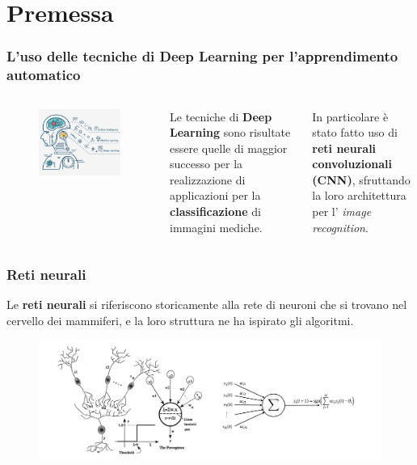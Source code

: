 \documentclass{beamer}
\begin{document}
	 \section{Premessa}
\begin{frame}
	\frametitle{L'uso delle tecniche di Deep Learning per l'apprendimento automatico
	}
	\begin{columns}
		\begin{figure}
			\includegraphics[width=\textwidth]{learning.png}
		\end{figure}
		Le tecniche di \textbf{Deep Learning} sono risultate essere quelle di maggior successo per la realizzazione di applicazioni per la \textbf{classificazione} di immagini mediche.
	
	In particolare è stato fatto uso di \textbf{reti neurali convoluzionali (CNN)}, sfruttando la loro architettura per l'
	\emph{image recognition}.
	\end{columns}
\end{frame}

\begin{frame}
	\frametitle{Reti neurali}
	Le \textbf{reti neurali} si riferiscono storicamente alla rete di neuroni che si trovano nel cervello 
	dei mammiferi, e la loro struttura ne ha ispirato gli algoritmi.
	\medskip
	\begin{figure}
		\includegraphics[width=1\textwidth]{confronto neurone biologico-artificiale.PNG}
	\end{figure}
\end{frame}
\end{document}
